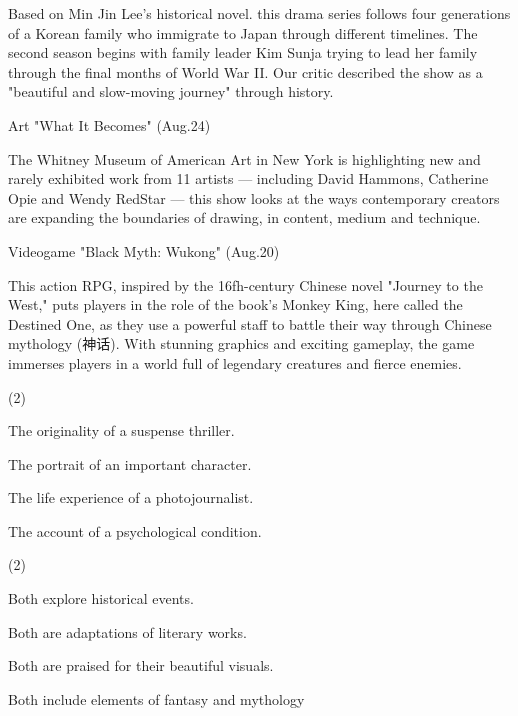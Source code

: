 \documentclass{英语试卷}
\begin{document}
\par Based on Min Jin Lee's historical novel. this drama series follows four generations of a Korean family who immigrate to Japan through different timelines. The second season begins with family leader Kim Sunja trying to lead her family through the final months of World War II. Our critic described the show as a "beautiful and slow-moving journey" through history.\par
\par Art "What It Becomes" (Aug.24)\par
\par The Whitney Museum of American Art in New York is highlighting new and rarely exhibited work from 11 artists — including David Hammons, Catherine Opie and Wendy RedStar — this show looks at the ways contemporary creators are expanding the boundaries of drawing, in content, medium and technique.\par
\par Videogame "Black Myth: Wukong" (Aug.20)\par
\par This action RPG, inspired by the 16fh-century Chinese novel "Journey to the West," puts players in the role of the book’s Monkey King, here called the Destined One, as they use a powerful staff to battle their way through Chinese mythology (神话). With stunning graphics and exciting gameplay, the game immerses players in a world full of legendary creatures and fierce enemies.\par
{}
\begin{choices}(2)
  \item The originality of a suspense thriller.
  \item The portrait of an important character.
  \item The life experience of a photojournalist.
  \item The account of a psychological condition.
\end{choices}
\begin{choices}(2)
  \item Both explore historical events.
  \item Both are adaptations of literary works.
  \item Both are praised for their beautiful visuals.
  \item Both include elements of fantasy and mythology
\end{choices}
\end{document}
